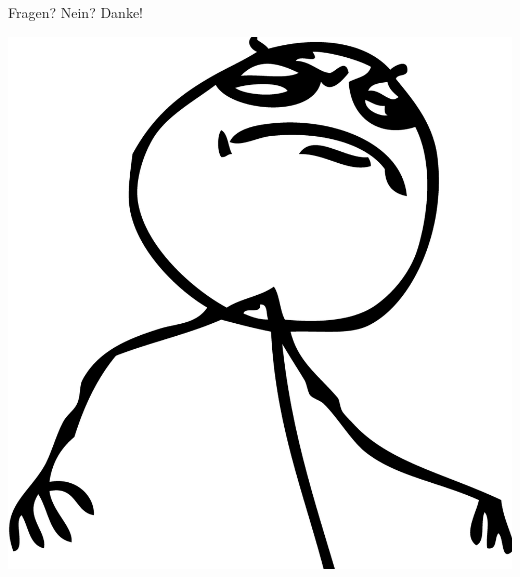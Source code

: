\documentclass{beamer}
\begin{document}
			\begin{frame}
				Fragen? Nein? Danke!

				\begin{center}
					\includegraphics[height=0.4\textheight]{img/fuck-yeah}
				\end{center}
			\end{frame}
\end{document}
